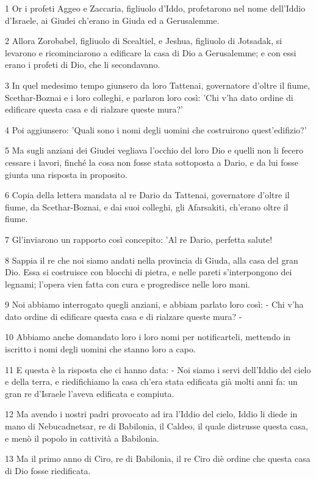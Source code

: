 \par 1 Or i profeti Aggeo e Zaccaria, figliuolo d'Iddo, profetarono nel nome dell'Iddio d'Israele, ai Giudei ch'erano in Giuda ed a Gerusalemme.
\par 2 Allora Zorobabel, figliuolo di Scealtiel, e Jeshua, figliuolo di Jotsadak, si levarono e ricominciarono a edificare la casa di Dio a Gerusalemme; e con essi erano i profeti di Dio, che li secondavano.
\par 3 In quel medesimo tempo giunsero da loro Tattenai, governatore d'oltre il fiume, Scethar-Boznai e i loro colleghi, e parlaron loro così: 'Chi v'ha dato ordine di edificare questa casa e di rialzare queste mura?'
\par 4 Poi aggiunsero: 'Quali sono i nomi degli uomini che costruirono quest'edifizio?'
\par 5 Ma sugli anziani dei Giudei vegliava l'occhio del loro Dio e quelli non li fecero cessare i lavori, finché la cosa non fosse stata sottoposta a Dario, e da lui fosse giunta una risposta in proposito.
\par 6 Copia della lettera mandata al re Dario da Tattenai, governatore d'oltre il fiume, da Scethar-Boznai, e dai suoi colleghi, gli Afarsakiti, ch'erano oltre il fiume.
\par 7 Gl'inviarono un rapporto così concepito: 'Al re Dario, perfetta salute!
\par 8 Sappia il re che noi siamo andati nella provincia di Giuda, alla casa del gran Dio. Essa si costruisce con blocchi di pietra, e nelle pareti s'interpongono dei legnami; l'opera vien fatta con cura e progredisce nelle loro mani.
\par 9 Noi abbiamo interrogato quegli anziani, e abbiam parlato loro così: - Chi v'ha dato ordine di edificare questa casa e di rialzare queste mura? -
\par 10 Abbiamo anche domandato loro i loro nomi per notificarteli, mettendo in iscritto i nomi degli uomini che stanno loro a capo.
\par 11 E questa è la risposta che ci hanno data: - Noi siamo i servi dell'Iddio del cielo e della terra, e riedifichiamo la casa ch'era stata edificata già molti anni fa: un gran re d'Israele l'aveva edificata e compiuta.
\par 12 Ma avendo i nostri padri provocato ad ira l'Iddio del cielo, Iddio li diede in mano di Nebucadnetsar, re di Babilonia, il Caldeo, il quale distrusse questa casa, e menò il popolo in cattività a Babilonia.
\par 13 Ma il primo anno di Ciro, re di Babilonia, il re Ciro diè ordine che questa casa di Dio fosse riedificata.
